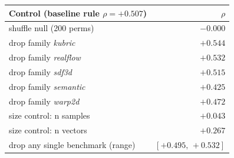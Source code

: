 \begin{tabular}{l r}
\toprule
Control (baseline rule $\rho = +0.507$) & $\rho$ \\
\midrule
shuffle null (200 perms) & $-0.000$ \\
drop family \emph{kubric} & $+0.544$ \\
drop family \emph{realflow} & $+0.532$ \\
drop family \emph{sdf3d} & $+0.515$ \\
drop family \emph{semantic} & $+0.425$ \\
drop family \emph{warp2d} & $+0.472$ \\
size control: n samples & $+0.043$ \\
size control: n vectors & $+0.267$ \\
drop any single benchmark (range) & $[+0.495,\,+0.532]$ \\
\bottomrule
\end{tabular}

